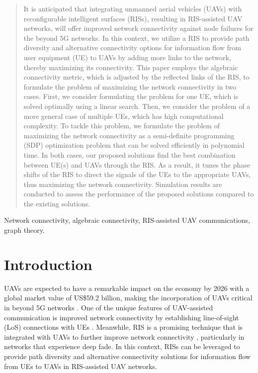\documentclass[conference]{IEEEtran}
\begin{document}
\begin{abstract}
It is anticipated that integrating unmanned aerial vehicles (UAVs) with reconfigurable intelligent surfaces (RISs), resulting in RIS-assisted UAV networks, will offer improved network connectivity  against node failures for the beyond 5G networks. In this context, we utilize a RIS to provide path diversity and alternative connectivity options for information flow from user equipment (UE) to UAVs by adding more links to the network, thereby maximizing  its connectivity. This paper employs the algebraic connectivity metric, which is adjusted by the reflected links of the RIS, to formulate the problem of maximizing the network connectivity in two cases. First, we consider formulating the problem for one UE, which is solved optimally using a linear search. Then, we consider the problem of a more general case of multiple UEs, which has high computational complexity. To tackle this problem, we formulate the problem of maximizing the network connectivity  as a semi-definite programming (SDP) optimization problem that can be solved efficiently in polynomial time. In both cases, our proposed solutions find the best combination between UE(s) and UAVs through the RIS. As a result, it tunes the  phase shifts of the RIS to direct the  signals of the UEs to the appropriate UAVs, thus maximizing the network connectivity. Simulation results are conducted to assess the performance of the proposed solutions compared to the existing solutions. 
\end{abstract}

\begin{IEEEkeywords}
Network  connectivity, algebraic connectivity, RIS-assisted UAV communications, graph theory.
\end{IEEEkeywords}

\section{Introduction}
UAVs are expected to have a remarkable impact on the economy by 2026 with a global market value of US\$59.2 billion, making the incorporation of UAVs critical in beyond 5G networks \cite{UAV_economy}. One of the unique features of UAV-assisted communication is improved network connectivity by establishing line-of-sight (LoS) connections with UEs \cite{saif}. Meanwhile, RIS is a promising technique that is integrated with UAVs to further improve network connectivity \cite{M}, particularly in networks that experience deep fade.  In this context, RISs can be leveraged to provide path diversity and alternative connectivity solutions for information flow from UEs to UAVs in RIS-assisted UAV networks.
\end{document}
